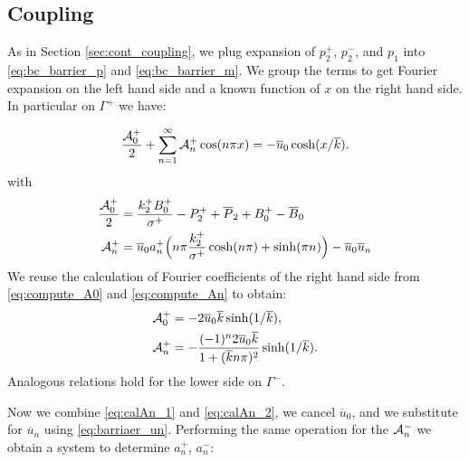 \documentclass[a4paper,10pt]{article}
\def\ol#1{\overline{#1}}
\begin{document}
\subsection{Coupling}

As in Section \ref{sec:cont_coupling}, we plug expansion of $p_2^+$, $p_2^-$, and $p_1$ into \eqref{eq:bc_barrier_p} and \eqref{eq:bc_barrier_m}. 
We group the terms to get Fourier expansion on the left hand side and a known function of $x$ on the right hand side.
In particular on  $\Gamma^+$ we have:
% 

\begin{equation}
    \label{eq:fourier_coupling}
    \frac{{\cal A}_0^+}{2} + \sum^{\infty}_{n=1} {\cal A}_n^+ \cos (n\pi x) =  - \ol{u}_0 \cosh(x/ \ol{k}).
\end{equation}
with
\begin{align}
    \label{eq:calA0_1}
    \frac{{\cal A}_0^+}{2} &= \frac{k_2^+ B_0^+}{\sigma^+} - P_2^+ + \ol{P}_2 + B_0^+ - \ol{B}_0\\
    \label{eq:calAn_1}
    {\cal A}_n^+          &=  \ol{u}_0 a_n^+ \Big( n \pi \frac{k_2^+ }{\sigma^+}  \cosh(n \pi) 
        +     \sinh(\pi n)  \Big) 
        - \ol{u}_0 \ol{u}_n   
\end{align}
We reuse the calculation of Fourier coefficients of the right hand side from \eqref{eq:compute_A0} and \eqref{eq:compute_An} to obtain:
\begin{align}
    \label{eq:calA0_2}
    {\cal A}_0^+ &= - 2 \ol{u}_0 \ol{k}\sinh( 1/\ol{k} ), \\
    \label{eq:calAn_2}
    {\cal A}_n^+ &=  - \frac{(-1)^n  2 \ol{u}_0 \ol{k}}{1+(\ol{k} n \pi)^2}\sinh(1/\ol{k}).
\end{align}
Analogous relations hold for the lower side on $\Gamma^-$.

Now we combine \eqref{eq:calAn_1} and \eqref{eq:calAn_2}, we cancel $\ol{u}_0$, and we substitute for $\ol{u}_n$ using \eqref{eq:barriaer_un}.
Performing the same operation for the ${\cal A}_n^-$  we obtain a system to determine $a_n^+$, $a_n^-$:
\end{document}
